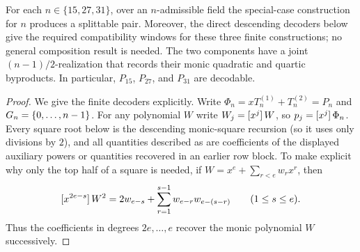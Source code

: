 \begin{lemma}\label{lem:special-cases-splittable}
    For each $n\in\{15,27,31\}$, over an $n$-admissible field the
    special-case construction for $n$ produces a splittable pair.
    Moreover, the direct descending decoders below give the required
    compatibility windows for these three finite constructions; no general
    composition result is needed.  The two components have a joint
    $(n-1)/2$-realization that records their monic quadratic and quartic
    byproducts.
    In particular, $P_{15}$, $P_{27}$, and $P_{31}$ are decodable.
\end{lemma}
\begin{proof}
    We give the finite decoders explicitly.  Write
    $\Phi_n=xT^{(1)}_n+T^{(2)}_n=P_n$ and $G_n=\rng n$.
    For any polynomial $W$ write $W_j=\coeff{W}{j}$, so
    $p_j=\coeff{\Phi_n}{j}$.  Every square root below is the descending
    monic-square recursion (so it uses only divisions by $2$), and all
    quantities described as  are coefficients of the displayed
    auxiliary powers or quantities recovered in an earlier row block.
    To make explicit why only the top half of a square is needed, if
    $W=x^e+\sum_{r<e}w_rx^r$, then
    \[
      \coeff{W^2}{2e-s}
        =2w_{e-s}+\sum_{r=1}^{s-1}w_{e-r}w_{e-(s-r)}
        \qquad(1\le s\le e).
    \]
    Thus the coefficients in degrees $2e,\ldots,e$ recover the monic
    polynomial $W$ successively.


\end{proof}
